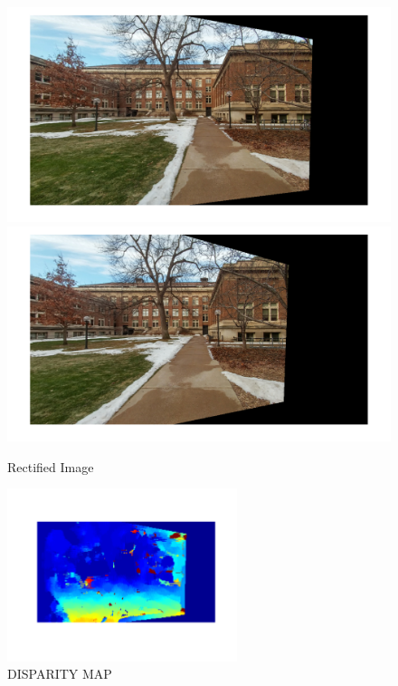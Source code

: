 \documentclass[letter, 10pt]{article}
\begin{document}
\begin{figure}[H]
        \centering
        \includegraphics[width=\textwidth]{HW5/RESULT/im1_w.png}
    \endminipage\hfill
        \centering
        \includegraphics[width=\textwidth]{HW5/RESULT/im2_w.png}
    \endminipage\hfill
    \caption{Rectified Image}
\end{figure}

\begin{figure}[H]
    \centering
    \includegraphics[width=0.6\textwidth]{HW5/RESULT/disp.png}
    \caption{DISPARITY MAP}
    \label{fig:my_label}
\end{figure}
\end{document}
